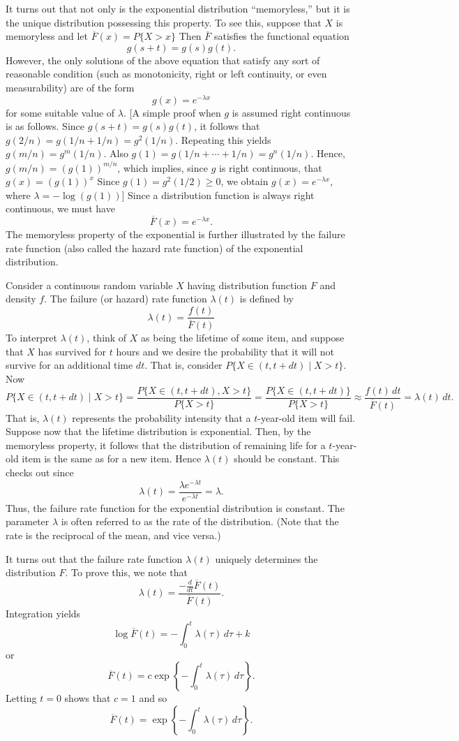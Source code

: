 \documentclass[lang=cn,10pt,thmcnt=section]{elegantbook}
\begin{document}
\begin{example}
It turns out that not only is the exponential distribution ``memoryless,'' but it is the unique distribution possessing this property. To see this, suppose that $X$ is memoryless and let $\overline{F}(x) = P\{X > x\}$ Then $\overline{F}$ satisfies the functional equation
\[
g(s + t) = g(s)g(t).
\]
However, the only solutions of the above equation that satisfy any sort of reasonable condition (such as monotonicity, right or left continuity, or even measurability) are of the form
\[
g(x) = e^{-\lambda x}
\]
for some suitable value of $\lambda$. [A simple proof when $g$ is assumed right continuous is as follows. Since $g(s + t) = g(s)g(t)$, it follows that $g(2/n) = g(1/n + 1/n) = g^2(1/n)$. Repeating this yields $g(m/n) = g^m(1/n)$. Also $g(1) = g(1/n + \cdots + 1/n) = g^n(1/n)$. Hence, $g(m/n) = (g(1))^{m/n}$, which implies, since $g$ is right continuous, that $g(x) = (g(1))^x$ Since $g(1) = g^2(1/2) \geq 0$, we obtain $g(x) = e^{-\lambda x}$, where $\lambda = -\log(g(1))$] Since a distribution function is always right continuous, we must have
\[
\overline{F}(x) = e^{-\lambda x}.
\]
The memoryless property of the exponential is further illustrated by the failure rate function (also called the hazard rate function) of the exponential distribution.

Consider a continuous random variable $X$ having distribution function $F$ and density $f$. The failure (or hazard) rate function $\lambda(t)$ is defined by
\begin{equation}
\lambda(t) = \frac{f(t)}{\overline{F}(t)} \tag{1.6.3}
\end{equation}
To interpret $\lambda(t)$, think of $X$ as being the lifetime of some item, and suppose that $X$ has survived for $t$ hours and we desire the probability that it will not survive for an additional time $dt$. That is, consider $P\{X \in (t, t + dt) \mid X > t\}$. Now
\[
P\{X \in (t, t + dt) \mid X > t\} = \frac{P\{X \in (t, t + dt), X > t\}}{P\{X > t\}} = \frac{P\{X \in (t, t + dt)\}}{P\{X > t\}} \approx \frac{f(t) \, dt}{\overline{F}(t)} = \lambda(t) \, dt.
\]
That is, $\lambda(t)$ represents the probability intensity that a $t$-year-old item will fail. Suppose now that the lifetime distribution is exponential. Then, by the memoryless property, it follows that the distribution of remaining life for a $t$-year-old item is the same as for a new item. Hence $\lambda(t)$ should be constant. This checks out since
\[
\lambda(t) = \frac{\lambda e^{-\lambda t}}{e^{-\lambda t}} = \lambda.
\]
Thus, the failure rate function for the exponential distribution is constant. The parameter $\lambda$ is often referred to as the rate of the distribution. (Note that the rate is the reciprocal of the mean, and vice versa.)

It turns out that the failure rate function $\lambda(t)$ uniquely determines the distribution $F$. To prove this, we note that
\[
\lambda(t) = \frac{-\frac{d}{dt} \overline{F}(t)}{\overline{F}(t)}.
\]
Integration yields
\[
\log \overline{F}(t) = -\int_{0}^{t} \lambda(\tau) \, d\tau + k
\]
or
\[
\overline{F}(t) = c \exp \left\{ -\int_{0}^{t} \lambda(\tau) \, d\tau \right\}.
\]
Letting $t = 0$ shows that $c = 1$ and so
\[
\overline{F}(t) = \exp \left\{ -\int_{0}^{t} \lambda(\tau) \, d\tau \right\}.
\]
\end{example}
\end{document}
